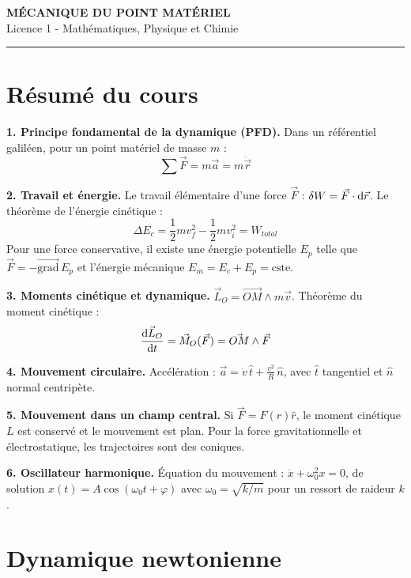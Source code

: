 \documentclass[12pt,a4paper]{article}
\begin{document}
\fi

\begin{center}
  {\LARGE\bfseries MÉCANIQUE DU POINT MATÉRIEL}\\[0.3cm]
  {\normalsize Licence 1 - Mathématiques, Physique et Chimie}\\[0.1cm]
  \rule{0.7\textwidth}{0.8pt}
\end{center}

\section*{Résumé du cours}

\begin{boiteresume}

\textbf{1. Principe fondamental de la dynamique (PFD).} Dans un référentiel galiléen, pour un point matériel de masse $m$ :
\[
\sum\vec{F} = m\vec{a} = m\ddot{\vec{r}}
\]

\textbf{2. Travail et énergie.} Le travail élémentaire d'une force $\vec{F}$ : $\delta W = \vec{F}\cdot\mathrm{d}\vec{r}$. Le théorème de l'énergie cinétique :
\[
\Delta E_c = \frac{1}{2}mv_f^2 - \frac{1}{2}mv_i^2 = W_{total}
\]
Pour une force conservative, il existe une énergie potentielle $E_p$ telle que $\vec{F} = -\overrightarrow{\text{grad}}\,E_p$ et l'énergie mécanique $E_m = E_c + E_p = \text{cste}$.

\textbf{3. Moments cinétique et dynamique.}
$\vec{L}_O = \vec{OM}\wedge m\vec{v}$. Théorème du moment cinétique :
\[
\frac{\mathrm{d}\vec{L}_O}{\mathrm{d} t} = \vec{M}_O(\vec{F}) = \vec{OM}\wedge\vec{F}
\]

\textbf{4. Mouvement circulaire.} Accélération : $\vec{a} = \dot{v}\,\hat{t} + \frac{v^2}{R}\,\hat{n}$, avec $\hat{t}$ tangentiel et $\hat{n}$ normal centripète.

\textbf{5. Mouvement dans un champ central.} Si $\vec{F} = F(r)\hat{r}$, le moment cinétique $L$ est conservé et le mouvement est plan. Pour la force gravitationnelle et électrostatique, les trajectoires sont des coniques.

\textbf{6. Oscillateur harmonique.} Équation du mouvement : $\ddot{x} + \omega_0^2 x = 0$, de solution $x(t) = A\cos(\omega_0 t + \varphi)$ avec $\omega_0 = \sqrt{k/m}$ pour un ressort de raideur $k$.

\end{boiteresume}

\newpage
\section{Dynamique newtonienne}
\end{document}
